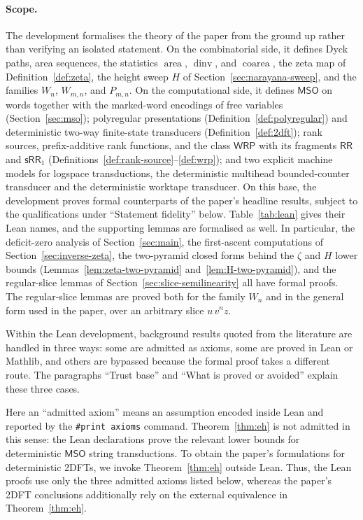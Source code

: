 \documentclass[11pt]{article}
\theoremstyle{definition}
\newcommand{\WRP}{\mathsf{WRP}}
\newcommand{\RR}{\mathsf{RR}}
\newcommand{\SWR}{\mathsf{sRR}_1}
\newcommand{\MSO}{\mathsf{MSO}}
\newcommand{\area}{\operatorname{area}}
\newcommand{\dinv}{\operatorname{dinv}}
\newcommand{\coarea}{\operatorname{coarea}}
\begin{document}
\paragraph{Scope.}
The development formalises the theory of the paper from the ground up rather
than verifying an isolated statement.  On the combinatorial side, it defines
Dyck paths, area sequences, the statistics $\area$, $\dinv$, and $\coarea$,
the zeta map of
Definition~\ref{def:zeta}, the height sweep $H$ of
Section~\ref{sec:narayana-sweep}, and the families $W_n$, $W_{m,n}$, and
$P_{m,n}$.
On the computational side, it defines $\MSO$ on words together with the
marked-word encodings of free variables (Section~\ref{sec:mso}); polyregular
presentations (Definition~\ref{def:polyregular}) and deterministic two-way
finite-state transducers (Definition~\ref{def:2dft}); rank sources,
prefix-additive rank functions, and the class $\WRP$ with its fragments $\RR$
and $\SWR$ (Definitions~\ref{def:rank-source}--\ref{def:wrp}); and two explicit
machine models for logspace transductions, the deterministic multihead
bounded-counter transducer and the deterministic worktape transducer.
On this base, the development proves formal counterparts of the paper's
headline results, subject to the qualifications under ``Statement fidelity''
below.  Table~\ref{tab:lean} gives their Lean names, and the supporting lemmas
are formalised as well.  In particular, the deficit-zero analysis of
Section~\ref{sec:main}, the
first-ascent computations of Section~\ref{sec:inverse-zeta}, the two-pyramid
closed forms behind the $\zeta$ and $H$ lower bounds
(Lemmas~\ref{lem:zeta-two-pyramid} and~\ref{lem:H-two-pyramid}), and the
regular-slice lemmas of Section~\ref{sec:slice-semilinearity} all have formal
proofs.  The regular-slice lemmas are proved both for the family $W_n$ and in
the general form used in the paper, over an arbitrary slice $u\,v^n z$.

Within the Lean development, background results quoted from the literature are
handled in three ways: some are admitted as axioms, some are proved in
Lean or Mathlib, and others are bypassed because the formal proof takes a
different route.  The paragraphs ``Trust base'' and ``What is proved or
avoided'' explain these three cases.

Here an ``admitted axiom'' means an assumption encoded inside Lean and reported
by the \texttt{\#print axioms} command.  Theorem~\ref{thm:eh} is not admitted
in this sense: the Lean declarations prove the relevant lower bounds for
deterministic $\MSO$ string transductions.  To obtain the paper's formulations
for deterministic 2DFTs, we invoke Theorem~\ref{thm:eh} outside Lean.  Thus,
the Lean proofs use only the three admitted axioms listed below, whereas the
paper's 2DFT conclusions additionally rely on the external equivalence in
Theorem~\ref{thm:eh}.
\end{document}
